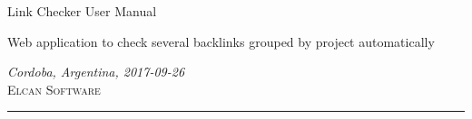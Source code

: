 \documentclass[a4paper]{article}
\author{%
	Mario O. Villarroel \\
	Customer Care/System Design\\
	\texttt{movilla@elcansoftware.com}\vspace{20pt} \\
	Juan P. Aguilar\\
	System Development \\
	\texttt{aguilarjpb@elcansoftware.com}
}
\def\documentdate{Cordoba, Argentina, 2017-09-26}
\begin{document}
	\begin{titlepage}
		\noindent
		\titlefont Link Checker User Manual\par
		\epigraph{Web application to check several backlinks grouped by project automatically}%
		{\textit{\documentdate}\\ \textsc{Elcan Software}}
		\null\vfill
		\vspace*{1cm}
		\noindent
		\hfill
		\begin{minipage}{0.50\linewidth}
		    \begin{flushright}
		        \printauthor
		    \end{flushright}
		\end{minipage}
		\begin{minipage}{0.02\linewidth}
		    \rule{1pt}{125pt}
		\end{minipage}
		\titlepagedecoration
	\end{titlepage}
	
	
\end{document}
